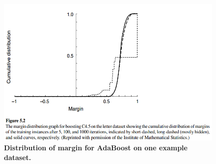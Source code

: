 \documentclass[11pt]{article}
\begin{document}
\begin{itemize}
\begin{figure}
\begin{minipage}[t]{1\linewidth}
  \centering
  \centerline{\includegraphics[scale = 0.4]{dist_margin.png}}
\end{minipage}
\caption{\footnotesize{\textbf{Distribution of margin for AdaBoost on one example dataset. \citep{schapire2012boosting}}}}
\label{fig: dist_margin}
\end{figure}


\end{itemize}
\end{document}

